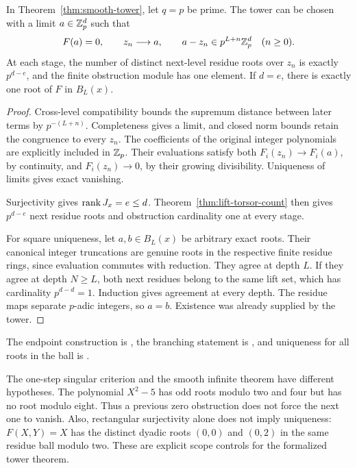 \begin{theorem}\label{thm:smooth-padic-root}
In Theorem~\ref{thm:smooth-tower}, let $q=p$ be prime. The tower can be
chosen with a limit $a\in\mathbb Z_p^d$ such that
\[
 F(a)=0,\qquad z_n\longrightarrow a,\qquad
 a-z_n\in p^{L+n}\mathbb Z_p^d\quad(n\ge0).
\]
At each stage, the number of distinct next-level residue roots over $z_n$
is exactly $p^{d-e}$, and the finite obstruction module has one element.
If $d=e$, there is exactly one root of $F$ in $B_L(x)$.
\end{theorem}

\begin{proof}
Cross-level compatibility bounds the supremum distance between later terms
by $p^{-(L+n)}$. Completeness gives a limit, and closed norm bounds retain
the congruence to every $z_n$. The coefficients of the original integer
polynomials are explicitly included in $\mathbb Z_p$. Their evaluations satisfy
both $F_i(z_n)\to F_i(a)$, by continuity, and $F_i(z_n)\to0$, by their
growing divisibility. Uniqueness of limits gives exact vanishing.

Surjectivity gives $\operatorname{rank} J_x=e\le d$. Theorem~\ref{thm:lift-torsor-count}
then gives $p^{d-e}$ next residue roots and obstruction cardinality one at
every stage.

For square uniqueness, let $a,b\in B_L(x)$ be arbitrary exact roots.
Their canonical integer truncations are genuine roots in the respective
finite residue rings, since evaluation commutes with reduction. They agree
at depth $L$. If they agree at depth $N\ge L$, both next residues belong
to the same lift set, which has cardinality $p^{d-d}=1$. Induction gives
agreement at every depth. The residue maps separate $p$-adic integers, so
$a=b$. Existence was already supplied by the tower.
\end{proof}

The endpoint construction is
, the
branching statement is
, and uniqueness
for all roots in the ball is
.

\begin{remark}\label{rem:singular-tower-boundary}
The one-step singular criterion and the smooth infinite theorem have
different hypotheses. The polynomial $X^2-5$ has odd roots modulo two and
four but has no root modulo eight. Thus a previous zero obstruction does
not force the next one to vanish. Also, rectangular surjectivity alone
does not imply uniqueness: $F(X,Y)=X$ has the distinct dyadic roots
$(0,0)$ and $(0,2)$ in the same residue ball modulo two. These are explicit
scope controls for the formalized tower theorem.
\end{remark}

